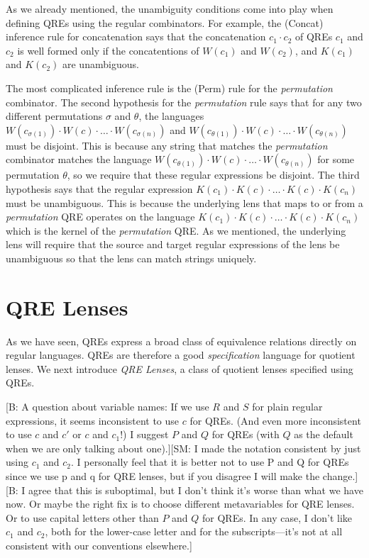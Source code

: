 \documentclass[acmsmall,review,anonymous]{acmart}
\newcommand{\FINISH}[3]{\ifdraft\textcolor{#1}{[#2: #3]}\fi}
\newcommand{\bcp}[1]{\FINISH{dkred}{B}{#1}}
\newcommand{\sam}[1]{\FINISH{dkpurple}{SM}{#1}}
\begin{document}
As we already mentioned, the unambiguity conditions come into play when defining
QREs using the regular combinators. For example, the (Concat) inference rule
for concatenation says that the concatenation $c_1 \cdot c_2$ of QREs $c_1$ and
$c_2$ is well formed only if the concatentions of $W(c_1)$ and $W(c_2)$, and
$K(c_1)$ and $K(c_2)$ are unambiguous.

The most complicated inference rule is the (Perm) rule for the
\textit{permutation} combinator. The second hypothesis for the
\textit{permutation} rule says that for any two different permutations $\sigma$
and $\theta$, the languages $W(c_{\sigma(1)}) \cdot W(c) \cdot \ldots \cdot
W(c_{\sigma(n)})$ and $W(c_{\theta(1)}) \cdot W(c) \cdot \ldots \cdot
W(c_{\theta(n)})$ must be disjoint. This is because any string that matches the
\textit{permutation} combinator matches the language $W(c_{\theta(1)}) \cdot
W(c) \cdot \ldots \cdot W(c_{\theta(n)})$ for some permutation $\theta$, so we
require that these regular expressions be disjoint.
%
The third hypothesis says that the regular expression $K(c_1) \cdot K(c)
\cdot \ldots \cdot K(c) \cdot K(c_n)$ must be unambiguous. This is because the
underlying lens that maps to or from a \textit{permutation} QRE operates on
the language $K(c_1) \cdot K(c) \cdot \ldots \cdot K(c) \cdot K(c_n)$ which is
the kernel of the \textit{permutation} QRE. As we mentioned, the underlying
lens will require that the source and target regular expressions of the lens be
unambiguous so that the lens can match strings uniquely.


\section{QRE Lenses}
\label{QRE-lenses}
As we have seen, QREs express a broad class of equivalence relations
directly on regular languages.  QREs are therefore a good \textit{specification}
language for quotient lenses. We next introduce
\textit{QRE Lenses}, a class of quotient lenses specified using QREs.

\bcp{A question about variable names: If we use $R$ and $S$ for plain
  regular expressions, it seems inconsistent to use $c$ for QREs.  (And even
  more inconsistent to use $c$ and $c'$ or $c$ and $c_1$!) I suggest $P$ and
  $Q$ for QREs (with $Q$ as the default when we are only talking about
  one).}\sam{I made the notation consistent by just using $c_1$ and $c_2$. I
  personally feel that it is better not to use P and Q for QREs since we use
  p and q for QRE lenses, but if you disagree I will make the change.}\bcp{I
  agree that this is suboptimal, but I don't think it's worse than what we
  have now.  Or maybe the right fix is to choose different metavariables for
  QRE lenses.  Or to use capital letters other than $P$ and $Q$ for QREs.
  In any case, I don't like $c_1$ and $c_2$, both for the lower-case letter
  and for the subscripts---it's not at all consistent with our conventions
  elsewhere.}
\end{document}
